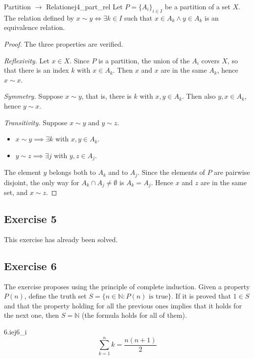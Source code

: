 \documentclass[11pt, a4paper]{article}
\begin{document}
\begin{proposicion}{Partition $\to$ Relation}{ej4_part_rel}
Let $P = \{A_i\}_{i \in I}$ be a partition of a set $X$.
The relation defined by $x \sim y \iff \exists k \in I$ such that $x \in A_k \land y \in A_k$ is an
equivalence relation.
\end{proposicion}

\begin{proof}
The three properties are verified.

\textit{Reflexivity.} Let $x \in X$. Since $P$ is a partition, the union of the $A_i$ covers $X$, so
that there is an index $k$ with $x \in A_k$. Then $x$ and $x$ are in the same $A_k$, hence
$x \sim x$.

\textit{Symmetry.} Suppose $x \sim y$, that is, there is $k$ with $x, y \in A_k$. Then also
$y, x \in A_k$, hence $y \sim x$.

\textit{Transitivity.} Suppose $x \sim y$ and $y \sim z$.
\begin{itemize}
    \item $x \sim y \implies \exists k$ with $x, y \in A_k$.
    \item $y \sim z \implies \exists j$ with $y, z \in A_j$.
\end{itemize}
The element $y$ belongs both to $A_k$ and to $A_j$. Since the elements of $P$ are pairwise
disjoint, the only way for $A_k \cap A_j \neq \emptyset$ is $A_k = A_j$. Hence $x$ and $z$ are in the
same set, and $x \sim z$.
\end{proof}

\subsection*{Exercise 5}

This exercise has already been solved.

\subsection*{Exercise 6}

The exercise proposes using the principle of complete induction.
Given a property $P(n)$, define the truth set
$S = \{n \in \mathbb{N} : P(n) \text{ is true}\}$.
If it is proved that $1 \in S$ and that the property holding for all the previous ones implies that
it holds for the next one, then $S = \mathbb{N}$ (the formula holds for all of them).

\begin{proposicion}{6.i}{ej6_i}
$$ \sum_{k=1}^{n}k=\frac{n(n+1)}{2} $$
\end{proposicion}
\end{document}

